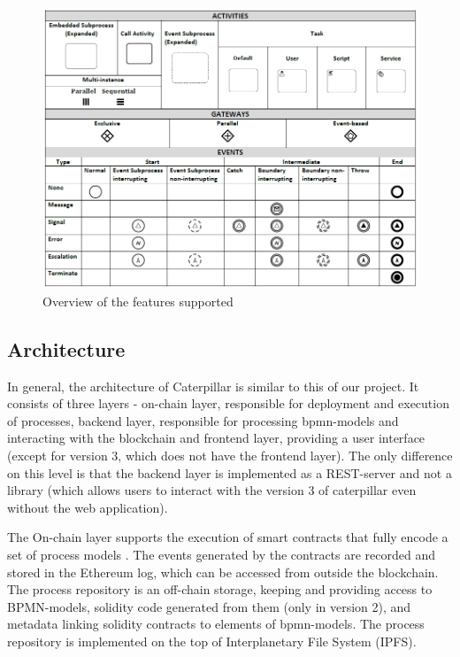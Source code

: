 \begin{figure}[hbt]
	\includegraphics[width=\textwidth]{gfx/caterpillar-bpmn}
	\caption{Overview of the features supported}
	\label{fig:caterpillar:overview:bpmn}
\end{figure}

\subsection{Architecture}
\label{sec:caterpillar:overview:architecture}

In general, the architecture of Caterpillar is similar to this of our project. It consists of three layers - on-chain layer, responsible for deployment and execution of processes, backend layer, responsible for processing bpmn-models and interacting with the blockchain and frontend layer, providing a user interface (except for version 3, which does not have the frontend layer). The only difference on this level is that the backend layer is implemented as a REST-server and not a library (which allows users to interact with the version 3 of caterpillar even without the web application).

The On-chain layer supports the execution of smart contracts that fully encode a set of process models \cite{caterpillar}. The events generated by the contracts are recorded and stored in the Ethereum log, which can be accessed from outside the blockchain. The process repository is an off-chain storage, keeping and providing access to BPMN-models, solidity code generated from them (only in version 2), and metadata linking solidity contracts to elements of bpmn-models. The process repository is implemented on the top of Interplanetary File System (IPFS).

